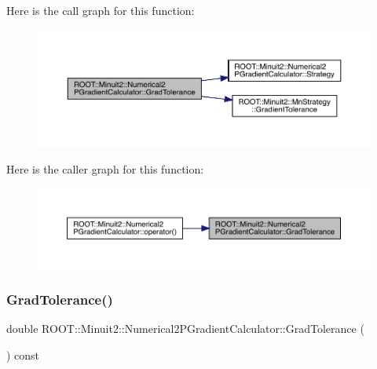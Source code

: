 Here is the call graph for this function\+:
\nopagebreak
\begin{figure}[H]
\begin{center}
\leavevmode
\includegraphics[width=350pt]{d0/d82/classROOT_1_1Minuit2_1_1Numerical2PGradientCalculator_aa0011cbece7254c7e17f053916e01c65_cgraph}
\end{center}
\end{figure}
Here is the caller graph for this function\+:
\nopagebreak
\begin{figure}[H]
\begin{center}
\leavevmode
\includegraphics[width=350pt]{d0/d82/classROOT_1_1Minuit2_1_1Numerical2PGradientCalculator_aa0011cbece7254c7e17f053916e01c65_icgraph}
\end{center}
\end{figure}
\mbox{\label{classROOT_1_1Minuit2_1_1Numerical2PGradientCalculator_aa0011cbece7254c7e17f053916e01c65}} 
\subsubsection{\texorpdfstring{GradTolerance()}{GradTolerance()}\hspace{0.1cm}{\footnotesize\ttfamily [2/3]}}
{\footnotesize\ttfamily double R\+O\+O\+T\+::\+Minuit2\+::\+Numerical2\+P\+Gradient\+Calculator\+::\+Grad\+Tolerance (\begin{DoxyParamCaption}{ }\end{DoxyParamCaption}) const}

